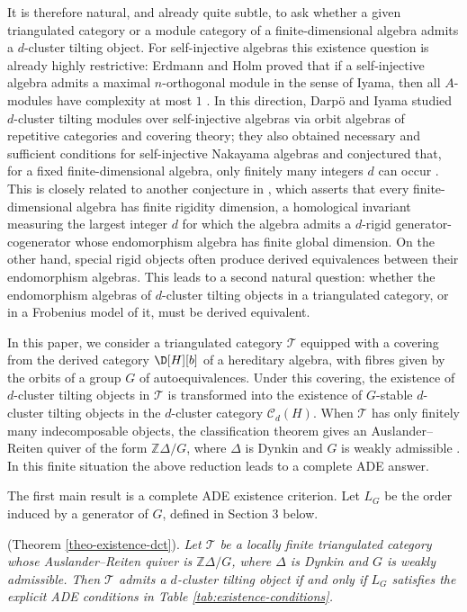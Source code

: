 \documentclass[12pt]{article}
\theoremstyle{plain}
\theoremstyle{definition}
\newcommand{\Db}[1][]{\D[#1][b]}
\begin{document}
It is therefore natural, and already quite subtle, to ask whether a given
triangulated category or a module category of a finite-dimensional algebra
admits a \(d\)-cluster tilting object.  For self-injective algebras this
existence question is already highly restrictive: Erdmann and Holm proved that
if a self-injective algebra admits a maximal \(n\)-orthogonal module in the
sense of Iyama, then all \(A\)-modules have complexity at most \(1\)
\cite{ErdmannHolm2008}.  In this direction, Darp\"o and Iyama
studied \(d\)-cluster tilting modules over self-injective algebras via orbit
algebras of repetitive categories and covering theory; they also obtained
necessary and sufficient conditions for self-injective Nakayama algebras and
conjectured that, for a fixed finite-dimensional algebra, only finitely many
integers \(d\) can occur \cite{DarpoIyama2020}.  This is closely related to
another conjecture in \cite{ChenFangKernerKoenigYamagata2021}, which asserts
that every finite-dimensional algebra has finite rigidity dimension, a
homological invariant measuring the largest integer \(d\) for which the algebra
admits a \(d\)-rigid generator-cogenerator whose endomorphism algebra has
finite global dimension.  On the other hand, special
rigid objects often produce derived equivalences between their endomorphism
algebras.  This leads to a second natural question: whether the endomorphism
algebras of \(d\)-cluster tilting objects in a triangulated category, or in a
Frobenius model of it, must be derived equivalent.

In this paper, we consider a triangulated category \(\mathcal T\) equipped with a covering
from the derived category \(\Db[H]\) of a hereditary algebra, with fibres given
by the orbits of a group \(G\) of autoequivalences.  Under this covering, the
existence of \(d\)-cluster tilting objects in \(\mathcal T\) is transformed
into the existence of \(G\)-stable \(d\)-cluster tilting objects in the
\(d\)-cluster category \(\mathcal C_d(H)\).  When \(\mathcal T\) has only
finitely many indecomposable objects, the classification theorem gives an
Auslander--Reiten quiver of the form \(\mathbb Z\Delta/G\), where \(\Delta\) is
Dynkin and \(G\) is weakly admissible \cite{Xiao2005,Amiot2007}.  In this
finite situation the above reduction leads to a complete ADE answer.

The first main result is a complete ADE existence criterion.  Let \(L_G\) be
the order induced by a generator of \(G\), defined in Section 3 below.
\medskip

 (Theorem \ref{theo-existence-dct}). {\em 
Let \(\mathcal T\) be a locally finite triangulated category whose
Auslander--Reiten quiver is \(\mathbb Z\Delta/G\), where \(\Delta\) is Dynkin
and \(G\) is weakly admissible.  Then \(\mathcal T\) admits a \(d\)-cluster
tilting object if and only if \(L_G\) satisfies the explicit ADE conditions in
Table \ref{tab:existence-conditions}.}
\end{document}

